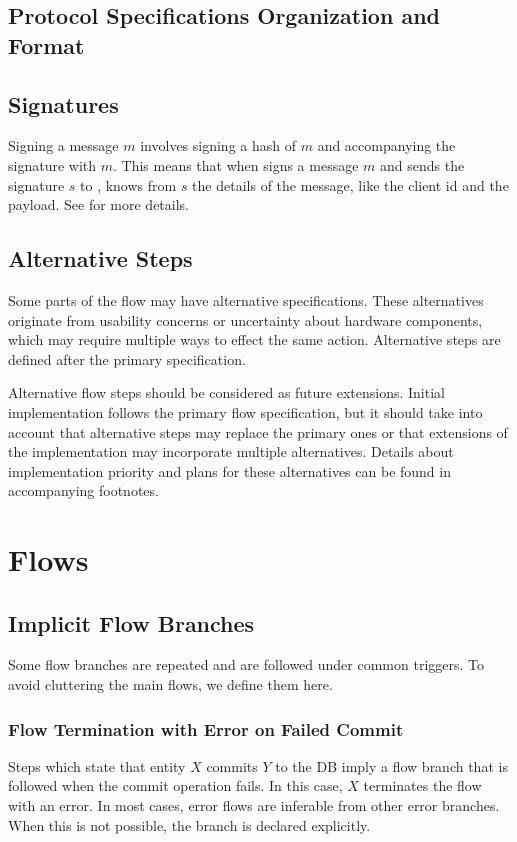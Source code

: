 \documentclass[a4paper,10pt]{article}
\begin{document}
\subsection{Protocol Specifications Organization and Format}

\subsection{Signatures}\label{sec:signatures}

Signing a message $m$ involves signing a hash of $m$ and accompanying the signature with $m$. This means that when  signs a message $m$ and sends the signature 
$s$ to \Server{}, \Server{} knows from $s$ the details of the message, like the client id and the payload. See \cite{crypto_spec} for more details.

\subsection{Alternative Steps}
Some parts of the flow may have alternative specifications. These alternatives originate from usability concerns or uncertainty about hardware components, which may require 
multiple ways to effect the same action. Alternative steps are defined after the primary specification.

Alternative flow steps should be considered as future extensions. Initial implementation follows the primary flow specification, but it should take into account that alternative 
steps may replace the primary ones or that extensions of the implementation may incorporate multiple alternatives. Details about implementation priority and plans for these 
alternatives can be found in accompanying footnotes.

\section{Flows}

\subsection{Implicit Flow Branches}
Some flow branches are repeated and are followed under common triggers. To avoid cluttering the main flows, we define them here.

\subsubsection{Flow Termination with Error on Failed Commit}
Steps which state that entity $X$ commits $Y$ to the DB imply a flow branch that is followed when the commit operation fails. In this case, $X$ terminates the flow with an error. 
In most cases, error flows are inferable from other error branches. When this is not possible, the branch is declared explicitly. 
\end{document}
